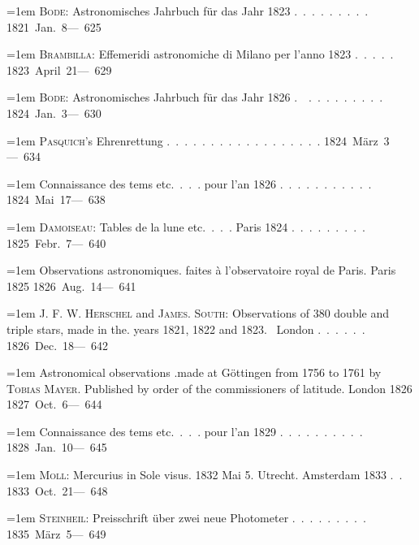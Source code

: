 \noindent\hangindent=1em \textsc{Bode}: Astronomisches Jahrbuch für das Jahr 1823 \mbox{.\ .\ .\ .\ .\ .\ .\ .\ .} \hfill\mbox{1821 Jan. 8}\quad\mbox{--- 625}\par\smallskip
\noindent\hangindent=1em \textsc{Brambilla}: Effemeridi astronomiche di Milano per l'anno 1823 \mbox{.\ .\ .\ .\ .} \hfill\mbox{1823 April 21}\quad\mbox{--- 629}\par\smallskip
\noindent\hangindent=1em \textsc{Bode}: Astronomisches Jahrbuch für das Jahr 1826 \mbox{.\ \raisebox{.25ex}{-}\ .\ .\ .\ .\ .\ .\ .\ .\ .} \hfill\mbox{1824 Jan. 3}\quad\mbox{--- 630}\par\smallskip
\noindent\hangindent=1em \textsc{Pasquich}'s Ehrenrettung \mbox{.\ .\ .\ .\ .\ .\ .\ .\ .\ .\ .\ .\hspace{.6em}\ .\ .\ .\ .\ .\ .} \hfill\mbox{1824 März 3}\quad\mbox{--- 634}\par\smallskip
\noindent\hangindent=1em Connaissance des tems etc.\ .\ .\ . pour l'an 1826 \mbox{.\ .\ .\ .\ .\ .\ .\ .\ .\ .\ .} \hfill\mbox{1824 Mai 17}\quad\mbox{--- 638}\par\smallskip
\noindent\hangindent=1em \textsc{Damoiseau}: Tables de la lune etc.\ .\ .\ . Paris 1824 \mbox{.\ .\ .\ .\ .\ .\ .\ .\ .} \hfill\mbox{1825 Febr. 7}\quad\mbox{--- 640}\par\smallskip
\noindent\hangindent=1em Observations astronomiques. faites à l'observatoire royal de Paris. Paris 1825 \hfill\mbox{1826 Aug. 14}\quad\mbox{--- 641}\par\smallskip
\noindent\hangindent=1em J. F. W. \textsc{Herschel} and \textsc{James}. \textsc{South}: Observations of 380 double and triple stars, made in the. years 1821, 1822 and 1823.\  London \mbox{.\ .\ .\ .\ .\ .} \hfill\mbox{1826 Dec. 18}\quad\mbox{--- 642}\par\smallskip
\noindent\hangindent=1em Astronomical observations .made at Göttingen from 1756 to 1761 by \textsc{Tobias Mayer}. Published by order of the commissioners of latitude. London 1826 \hfill\mbox{1827 Oct. 6}\quad\mbox{--- 644}\par\smallskip
\noindent\hangindent=1em Connaissance des tems etc.\ .\ .\ . pour l'an 1829 \mbox{.\ .\ .\ .\ .\ .\ .\ .\ .\ .} \hfill\mbox{1828 Jan. 10}\quad\mbox{--- 645}\par\smallskip
\noindent\hangindent=1em \textsc{Moll}: Mercurius in Sole visus. 1832 Mai 5. Utrecht. Amsterdam 1833 \mbox{.\ .} \hfill\mbox{1833 Oct. 21}\quad\mbox{--- 648}\par\smallskip
\noindent\hangindent=1em \textsc{Steinheil}: Preisschrift über zwei neue Photometer \mbox{.\ .\ .\ .\ .\ .\ .\ .\ .} \hfill\mbox{1835 März 5}\quad\mbox{--- 649}\par\smallskip
